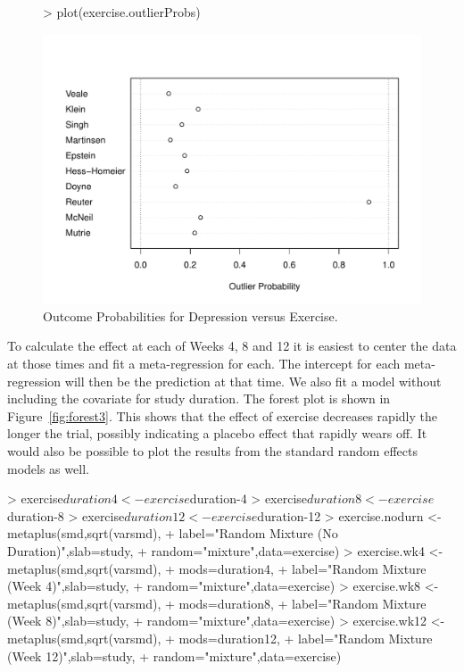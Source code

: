 \documentclass{article}
\begin{document}
\begin{figure}
  \centering
\begin{Schunk}
\begin{Sinput}
> plot(exercise.outlierProbs)
\end{Sinput}
\end{Schunk}
\includegraphics{metaplus-examples-016}
  \caption{Outcome Probabilities for Depression versus Exercise.}
  \label{fig:outprobs3}
\end{figure}

To calculate the effect at each of Weeks 4, 8 and 12 it is easiest to center the data at those times and fit a meta-regression for each. The intercept for each meta-regression will then be the prediction at that time. We also fit a model without including the covariate for study duration. The forest plot is shown in Figure~\ref{fig:forest3}. This shows that the effect of exercise decreases rapidly the longer the trial, possibly indicating a placebo effect that rapidly wears off. It would also be possible to plot the results from the standard random effects models as well.

\begin{Schunk}
\begin{Sinput}
> exercise$duration4 <- exercise$duration-4
> exercise$duration8 <- exercise$duration-8
> exercise$duration12 <- exercise$duration-12
> exercise.nodurn <- metaplus(smd,sqrt(varsmd),
+     label="Random Mixture (No Duration)",slab=study,
+     random="mixture",data=exercise)
> exercise.wk4 <- metaplus(smd,sqrt(varsmd),
+     mods=duration4,
+     label="Random Mixture (Week 4)",slab=study,
+     random="mixture",data=exercise)
> exercise.wk8 <- metaplus(smd,sqrt(varsmd),
+     mods=duration8,
+     label="Random Mixture (Week 8)",slab=study,
+     random="mixture",data=exercise)
> exercise.wk12 <- metaplus(smd,sqrt(varsmd),
+     mods=duration12,
+     label="Random Mixture (Week 12)",slab=study,
+     random="mixture",data=exercise)
\end{Sinput}
\end{Schunk}
\end{document}
